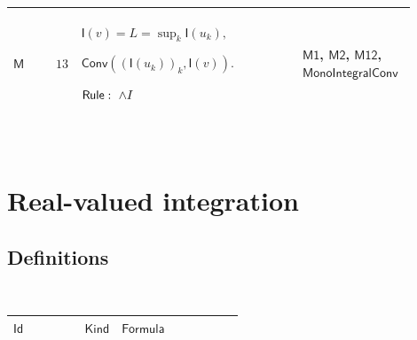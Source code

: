 \documentclass[12pt,reqno]{amsart}
\theoremstyle{blueplain}
\numberwithin{equation}{section}
\newlength{\DCTOneColumnBody}
\begin{document}
{\scriptsize \setlength{\parskip}{0pt}\nointerlineskip
\noindent 
\begin{tabular}{|@{}>{\centering\arraybackslash}m{0.10658\linewidth}|>{\centering\arraybackslash}m{0.03553\linewidth}|>{\centering\arraybackslash}m{0.52105\linewidth}|>{\centering\arraybackslash}m{0.23684\linewidth}|}
\hline
\hypertarget{proof:M13}{$\displaystyle \mathsf{M}$} & $\displaystyle 13$ & $%
\displaystyle \mathsf{I}(v)=L=\sup_k\mathsf{I}(u_k),$\par$\displaystyle 
\mathsf{Conv}((\mathsf{I}(u_k))_k,\mathsf{I}(v)).$\par$\displaystyle \mathsf{%
Rule}:\ \land I$ & \hyperlink{proof:M1}{$\displaystyle \mathsf{M1}$}, 
\hyperlink{proof:M2}{$\displaystyle \mathsf{M2}$}, \hyperlink{proof:M12}{$%
\displaystyle \mathsf{M12}$}, \hyperlink{lem:MonoIntegralConv}{$%
\displaystyle \mathsf{MonoIntegralConv}$} \\ \hline
\end{tabular}%
}

{\scriptsize \ }

\section{\protect\scriptsize Real-valued integration}

\subsection{\protect\scriptsize Definitions}

{\scriptsize {\ }}

{\scriptsize \setlength{\parskip}{0pt}\nointerlineskip
\noindent 
\begin{tabular}{|@{}>{\centering\arraybackslash}m{\DCTOneColumnBody}|}
\hline
$\displaystyle \mathsf{DCTDefinitions}$ \\ \hline
\end{tabular}%
}

{\scriptsize \setlength{\parskip}{0pt}\nointerlineskip
\noindent 
\begin{tabular}{|@{}>{\centering\arraybackslash}m{0.19251\linewidth}|>{\centering\arraybackslash}m{0.16845\linewidth}|>{\centering\arraybackslash}m{0.53904\linewidth}|}
\hline
$\displaystyle \mathsf{Id}$ & $\displaystyle \mathsf{Kind}$ & $\displaystyle 
\mathsf{Formula}$ \\ \hline
\end{tabular}%
}
\end{document}
